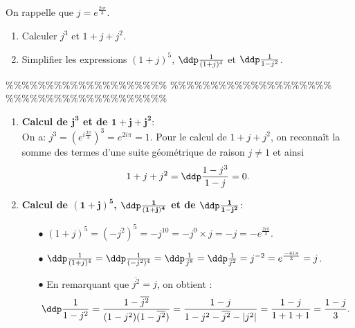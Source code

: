 



\begin{exercice} 
On rappelle que $j=e^{\frac{2i\pi}{3}}$.
\begin{enumerate}
\item Calculer $j^3$ et $1+j+j^2$.
\item Simplifier les expressions $(1+j)^5$, $\ddp\frac{1}{(1+j)^4}$ et $\ddp\frac{1}{1-j^2}$.
\end{enumerate}
\end{exercice}


\%\%\%\%\%\%\%\%\%\%\%\%\%\%\%\%\%\%\%\%
\%\%\%\%\%\%\%\%\%\%\%\%\%\%\%\%\%\%\%\%
\%\%\%\%\%\%\%\%\%\%\%\%\%\%\%\%\%\%\%\%




\begin{correction}   \;
\begin{enumerate}
\item \textbf{Calcul de $\mathbf{j^3}$ et de $\mathbf{1+j+j^2}$}:\\
\noindent On a: $j^3=\left(  e^{i\frac{2\pi}{3}} \right)^3=e^{2i\pi}=1$. Pour le calcul de $1+j+j^2$, on reconna\^{i}t la somme des termes d'une suite g\'eom\'etrique de raison $j\not= 1$ et ainsi
$$1+j+j^2=\ddp\frac{1-j^3}{1-j}=0.$$
\item \textbf{Calcul de $\mathbf{(1+j)^5}$, $\mathbf{\ddp\frac{1}{(1+j)^4}}$ et de $\mathbf{\ddp\frac{1}{1-j^2}}$}:
\begin{itemize}
\item[$\bullet$] $(1+j)^5= (-j^2)^5= -j^{10}=-j^9\times j=-j=-e^{\frac{2i\pi}{3}}$.
\item[$\bullet$] $\ddp\frac{1}{(1+j)^4}=\ddp\frac{1}{(-j^2)^4}=\ddp\frac{1}{j^8}=\ddp\frac{1}{j^2}=j^{-2}=e^{\frac{-4i\pi}{3}}=j$.
\item[$\bullet$] En remarquant que $\overline{j^2}=j$, on obtient :
$$\ddp\frac{1}{1-j^2}= \frac{1-\overline{j^2}}{(1-j^2)(1-\overline{j^2})} = \frac{1-j}{1-j^2-\overline{j^2}-|j^2|} = \frac{1-j}{1+1+1} = \frac{1-j}{3}.$$
\end{itemize}
\end{enumerate}
\end{correction}